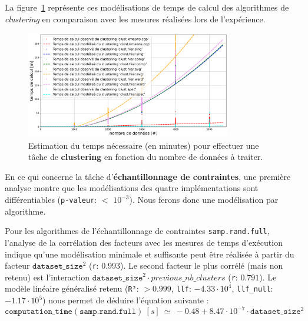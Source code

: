 			La figure~\ref{figure:4.3.2-ETUDE-COUTS-TEMPS-CALCUL-MODELISATION-CLUSTERING} représente ces modélisations de temps de calcul des algorithmes de \textit{clustering} en comparaison avec les mesures réalisées lors de l'expérience.
			\newline
			\begin{figure}[!htb]
				\centering
				\includegraphics[width=0.8\textwidth]{figures/etude-temps-calcul-modelisation-3clust}
				\caption{Estimation du temps nécessaire (en minutes) pour effectuer une tâche de \textbf{clustering} en fonction du nombre de données à traiter.}
				\label{figure:4.3.2-ETUDE-COUTS-TEMPS-CALCUL-MODELISATION-CLUSTERING}
			\end{figure}
			
			
			En ce qui concerne la tâche d'\textbf{échantillonnage de contraintes}, une première analyse montre que les modélisations des quatre implémentations sont différentiables  (\texttt{p-valeur}: $<$ \texttt{$10^{-3}$}). Nous ferons donc une modélisation par algorithme.
			
			Pour les algorithmes de l'échantillonnage de contraintes \texttt{samp.rand.full}, l'analyse de la corrélation des facteurs avec les mesures de temps d'exécution indique qu'une modélisation minimale et suffisante peut être réalisée à partir du facteur $\texttt{dataset\_size}^{2}$ (\texttt{r}: $0.993$).
			Le second facteur le plus corrélé (mais non retenu) est l'interaction $\texttt{dataset\_size}^{2} \cdot previous\_nb\_clusters$ (\texttt{r}: $0.791$).
			Le modèle linéaire généralisé retenu (\texttt{R²}: $> 0.999$, \texttt{llf}: $-4.33 \cdot 10^{4}$, \texttt{llf\_null}: $-1.17 \cdot 10^{5}$) nous permet de déduire l'équation suivante :
			\begin{equation}
				\texttt{computation\_time}(\texttt{samp.rand.full})~[s]~
				\simeq~-0.48 + 8.47 \cdot 10^{-7} \cdot \texttt{dataset\_size}^{2}
			\end{equation}
			
